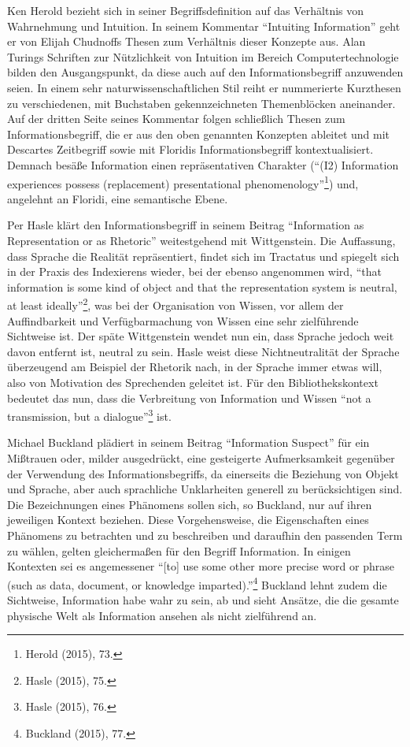 \documentclass[a4paper,
fontsize=11pt,
oneside,
numbers=noperiodatend,
parskip=half-,
bibliography=totoc,
final
]{scrartcl}
\begin{document}
Ken Herold bezieht sich in seiner Begriffsdefinition auf das Verhältnis
von Wahrnehmung und Intuition. In seinem Kommentar \enquote{Intuiting
Information} geht er von Elijah Chudnoffs Thesen zum Verhältnis dieser
Konzepte aus. Alan Turings Schriften zur Nützlichkeit von Intuition im
Bereich Computertechnologie bilden den Ausgangspunkt, da diese auch auf
den Informationsbegriff anzuwenden seien. In einem sehr
naturwissenschaftlichen Stil reiht er nummerierte Kurzthesen zu
verschiedenen, mit Buchstaben gekennzeichneten Themenblöcken aneinander.
Auf der dritten Seite seines Kommentar folgen schließlich Thesen zum
Informationsbegriff, die er aus den oben genannten Konzepten ableitet
und mit Descartes Zeitbegriff sowie mit Floridis Informationsbegriff
kontextualisiert. Demnach besäße Information einen repräsentativen
Charakter (\enquote{(I2) Information experiences possess (replacement)
presentational phenomenology}\footnote{Herold (2015), 73.}) und,
angelehnt an Floridi, eine semantische Ebene.

Per Hasle klärt den Informationsbegriff in seinem Beitrag
\enquote{Information as Representation or as Rhetoric} weitestgehend mit
Wittgenstein. Die Auffassung, dass Sprache die Realität repräsentiert,
findet sich im Tractatus und spiegelt sich in der Praxis des Indexierens
wieder, bei der ebenso angenommen wird, \enquote{that information is
some kind of object and that the representation system is neutral, at
least ideally}\footnote{Hasle (2015), 75.}, was bei der Organisation von
Wissen, vor allem der Auffindbarkeit und Verfügbarmachung von Wissen
eine sehr zielführende Sichtweise ist. Der späte Wittgenstein wendet nun
ein, dass Sprache jedoch weit davon entfernt ist, neutral zu sein. Hasle
weist diese Nichtneutralität der Sprache überzeugend am Beispiel der
Rhetorik nach, in der Sprache immer etwas will, also von Motivation des
Sprechenden geleitet ist. Für den Bibliothekskontext bedeutet das nun,
dass die Verbreitung von Information und Wissen \enquote{not a
transmission, but a dialogue}\footnote{Hasle (2015), 76.} ist.

Michael Buckland plädiert in seinem Beitrag \enquote{Information
Suspect} für ein Mißtrauen oder, milder ausgedrückt, eine gesteigerte
Aufmerksamkeit gegenüber der Verwendung des Informationsbegriffs, da
einerseits die Beziehung von Objekt und Sprache, aber auch sprachliche
Unklarheiten generell zu berücksichtigen sind. Die Bezeichnungen eines
Phänomens sollen sich, so Buckland, nur auf ihren jeweiligen Kontext
beziehen. Diese Vorgehensweise, die Eigenschaften eines Phänomens zu
betrachten und zu beschreiben und daraufhin den passenden Term zu
wählen, gelten gleichermaßen für den Begriff Information. In einigen
Kontexten sei es angemessener \enquote{{[}to{]} use some other more
precise word or phrase (such as data, document, or knowledge
imparted).}\footnote{Buckland (2015), 77.} Buckland lehnt zudem die
Sichtweise, Information habe wahr zu sein, ab und sieht Ansätze, die die
gesamte physische Welt als Information ansehen als nicht zielführend an.
\end{document}
